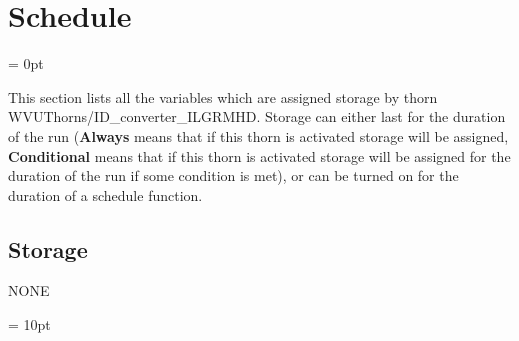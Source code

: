 
\section{Schedule} 


\parskip = 0pt


\noindent This section lists all the variables which are assigned storage by thorn WVUThorns/ID\_converter\_ILGRMHD.  Storage can either last for the duration of the run ({\bf Always} means that if this thorn is activated storage will be assigned, {\bf Conditional} means that if this thorn is activated storage will be assigned for the duration of the run if some condition is met), or can be turned on for the duration of a schedule function.


\subsection*{Storage}NONE

\vspace{5mm}\parskip = 10pt 
